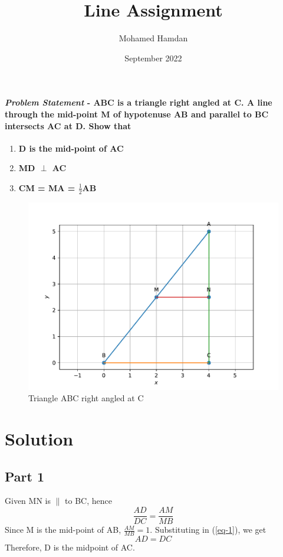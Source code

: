 \documentclass[journal,10pt,twocolumn]{article}
\title{\textbf{Line Assignment}}
\author{Mohamed Hamdan}
\date{September 2022}
\begin{document}
\maketitle
\paragraph{\textit{Problem Statement} - ABC is a triangle right angled at C. A line through the mid-point M of hypotenuse AB and parallel to BC intersects AC at D. Show that}
\begin{enumerate}
	\item \textbf{D is the mid-point of AC}
	\item \textbf{MD $\perp$ AC}
	\item \textbf{CM = MA = $\frac{1}{2}$AB}
\end{enumerate}

\begin{figure}[h]
\centering
\includegraphics[width=1\columnwidth]{figs/fig1.pdf}
\caption{Triangle ABC right angled at C}
\label{fig:triangle}
\end{figure}

\section*{Solution}

\subsection*{Part 1}
Given MN is $\parallel$ to BC, hence\\
\begin{equation}
\frac{AD}{DC} = \frac{AM}{MB}
\label{eq-1}
\end{equation}
Since M is the mid-point of AB, $\frac{AM}{MB} = 1$. Substituting in (\ref{eq-1}), we get\\
\begin{equation}
AD = DC
\label{eq-2}
\end{equation}
Therefore, D is the midpoint of AC.
\end{document}
